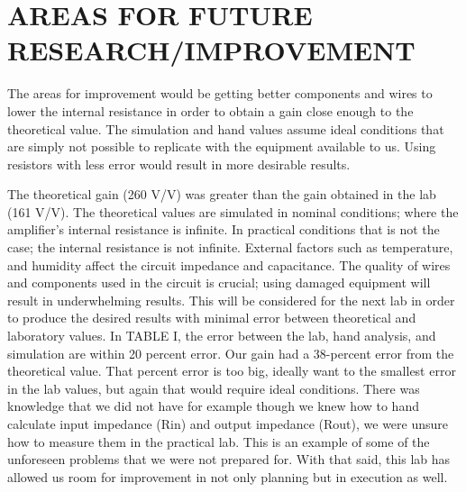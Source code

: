 \documentclass[conference]{IEEEtran}
\begin{document}
\section{AREAS FOR FUTURE RESEARCH/IMPROVEMENT}
The areas for improvement would be getting better components and wires to lower the internal resistance in order to obtain a gain close enough to the theoretical value.  The simulation and hand values assume ideal conditions that are simply not possible to replicate with the equipment available to us.  Using resistors with less error would result in more desirable results. 
\par
\vspace{12pt} %
The theoretical gain (260 V/V) was greater than the gain obtained in the lab (161 V/V).  The theoretical values are simulated in nominal conditions; where the amplifier's internal resistance is infinite.  In practical conditions that is not the case; the internal resistance is not infinite.  External factors such as temperature, and humidity affect the circuit impedance and capacitance.  The quality of wires and components used in the circuit is crucial; using damaged equipment will result in underwhelming results.  This will be considered for the next lab in order to produce the desired results with minimal error between theoretical and laboratory values.
In TABLE I, the error between the lab, hand analysis, and simulation are within 20 percent error.   Our gain had a 38-percent error from the theoretical value.  That percent error is too big, ideally want to the smallest error in the lab values, but again that would require ideal conditions.  There was knowledge that we did not have for example though we knew how to hand calculate input impedance (Rin) and output impedance (Rout), we were unsure how to measure them in the practical lab. This is an example of some of the unforeseen problems that we were not prepared for. With that said, this lab has allowed us room for improvement in not only planning but in execution as well.
\end{document}
